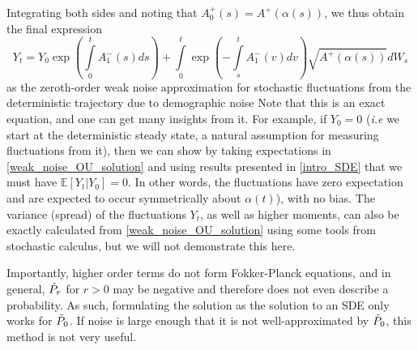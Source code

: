 Integrating both sides and noting that $A^+_0(s) = A^+(\alpha(s))$, we thus obtain the final expression
\begin{equation}
\label{weak_noise_OU_solution}
Y_t = Y_0\exp\left({\int\limits_{0}^{t}A^-_1(s)ds}\right)+\int\limits_{0}^{t}\exp\left(-\int\limits_{s}^{t}A^-_{1}(v)dv\right)\sqrt{A^+(\alpha(s))}dW_s
\end{equation}
as the zeroth-order weak noise approximation for stochastic fluctuations from the deterministic trajectory due to demographic noise Note that this is an exact equation, and one can get many insights from it. For example, if $Y_0 = 0$ (\emph{i.e} we start at the deterministic steady state, a natural assumption for measuring fluctuations from it), then we can show by taking expectations in \eqref{weak_noise_OU_solution} and using results presented in \ref{intro_SDE} that we must have $\mathbb{E}[Y_t | Y_0] = 0$. In other words, the fluctuations have zero expectation and are expected to occur symmetrically about $\alpha(t)$), with no bias. The variance (spread) of the fluctuations $Y_t$, as well as higher moments, can also be exactly calculated from \eqref{weak_noise_OU_solution} using some tools from stochastic calculus, but we will not demonstrate this here.

Importantly, higher order terms do not form Fokker-Planck equations, and in general, $\Tilde{P}_r$ for $r>0$ may be negative and therefore does not even describe a probability. As such, formulating the solution as the solution to an SDE only works for $\Tilde{P}_0$. If noise is large enough that it is not well-approximated by $\Tilde{P}_0$, this method is not very useful.